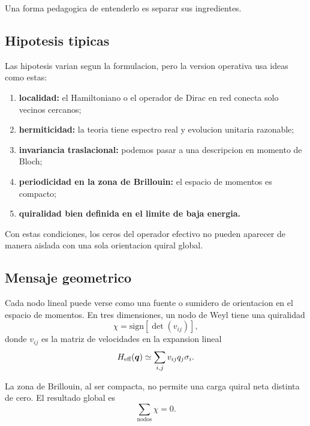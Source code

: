 Una forma pedagogica de entenderlo es separar sus ingredientes.

\subsection{Hipotesis tipicas}

Las hipotesis varian segun la formulacion, pero la version operativa usa ideas como estas:

\begin{enumerate}[leftmargin=*]
  \item \textbf{localidad:} el Hamiltoniano o el operador de Dirac en red conecta solo vecinos cercanos;
  \item \textbf{hermiticidad:} la teoria tiene espectro real y evolucion unitaria razonable;
  \item \textbf{invariancia traslacional:} podemos pasar a una descripcion en momento de Bloch;
  \item \textbf{periodicidad en la zona de Brillouin:} el espacio de momentos es compacto;
  \item \textbf{quiralidad bien definida en el limite de baja energia.}
\end{enumerate}

Con estas condiciones, los ceros del operador efectivo no pueden aparecer de manera aislada con una sola orientacion quiral global.

\subsection{Mensaje geometrico}

Cada nodo lineal puede verse como una fuente o sumidero de orientacion en el espacio de momentos. En tres dimensiones, un nodo de Weyl tiene una quiralidad
\begin{equation}
\chi = \mathrm{sign}\!\left[\det(v_{ij})\right],
\end{equation}
donde \(v_{ij}\) es la matriz de velocidades en la expansion lineal
\begin{equation}
H_{\text{eff}}(\bm{q})\simeq \sum_{i,j} v_{ij} q_j \sigma_i.
\end{equation}

La zona de Brillouin, al ser compacta, no permite una carga quiral neta distinta de cero. El resultado global es
\begin{equation}
\sum_{\text{nodos}} \chi = 0.
\label{c26:eq:chi-zero}
\end{equation}

